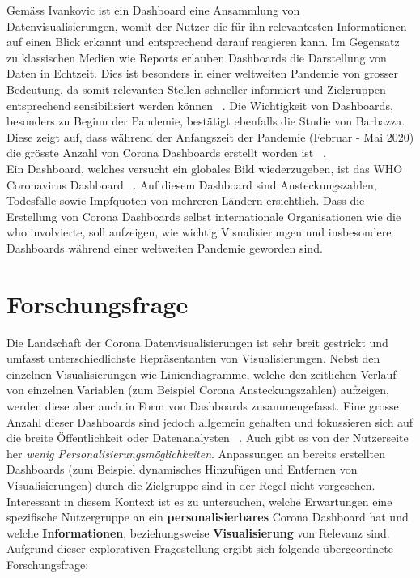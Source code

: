 \documentclass[12pt, oneside]{article}
\begin{document}
Gemäss Ivankovic ist ein Dashboard eine Ansammlung von Datenvisualisierungen, womit der Nutzer die für ihn relevantesten Informationen auf einen Blick erkannt und entsprechend darauf reagieren kann. Im Gegensatz zu klassischen Medien wie Reports erlauben Dashboards die Darstellung von Daten in Echtzeit. Dies ist besonders in einer weltweiten Pandemie von grosser Bedeutung, da somit relevanten Stellen schneller informiert und Zielgruppen entsprechend sensibilisiert werden können ~\citep[S. 2]{Ivankovic.2021}. Die Wichtigkeit von Dashboards, besonders zu Beginn der Pandemie, bestätigt ebenfalls die Studie von Barbazza. Diese zeigt auf, dass während der Anfangszeit der Pandemie (Februar - Mai 2020) die grösste Anzahl von Corona Dashboards erstellt worden ist ~\citep[S. 8]{Barbazza.2021}.\\

Ein Dashboard, welches versucht ein globales Bild wiederzugeben, ist das WHO Coronavirus Dashboard ~\citep{WHO.23.04.2022}. Auf diesem Dashboard sind Ansteckungszahlen, Todesfälle sowie Impfquoten von mehreren Ländern ersichtlich. Dass die Erstellung von Corona Dashboards selbst internationale Organisationen wie die \Gls{who} involvierte, soll aufzeigen, wie wichtig Visualisierungen und insbesondere Dashboards während einer weltweiten Pandemie geworden sind.
\clearpage

\section{Forschungsfrage}
Die Landschaft der Corona Datenvisualisierungen ist sehr breit gestrickt und umfasst unterschiedlichste Repräsentanten von Visualisierungen. Nebst den einzelnen Visualisierungen wie Liniendiagramme, welche den zeitlichen Verlauf von einzelnen Variablen (zum Beispiel Corona Ansteckungszahlen) aufzeigen, werden diese aber auch in Form von Dashboards zusammengefasst. Eine grosse Anzahl dieser Dashboards sind jedoch allgemein gehalten und fokussieren sich auf die breite Öffentlichkeit oder Datenanalysten ~\citep[S. 14]{Barbazza.2021}. Auch gibt es von der Nutzerseite her \textit{wenig Personalisierungsmöglichkeiten}. Anpassungen an bereits erstellten Dashboards (zum Beispiel dynamisches Hinzufügen und Entfernen von Visualisierungen) durch die Zielgruppe sind in der Regel nicht vorgesehen. Interessant in diesem Kontext ist es zu untersuchen, welche Erwartungen eine spezifische Nutzergruppe an ein \textbf{personalisierbares} Corona Dashboard hat und welche \textbf{Informationen}, beziehungsweise \textbf{Visualisierung} von Relevanz sind. Aufgrund dieser explorativen Fragestellung ergibt sich folgende übergeordnete Forschungsfrage:
\end{document}
